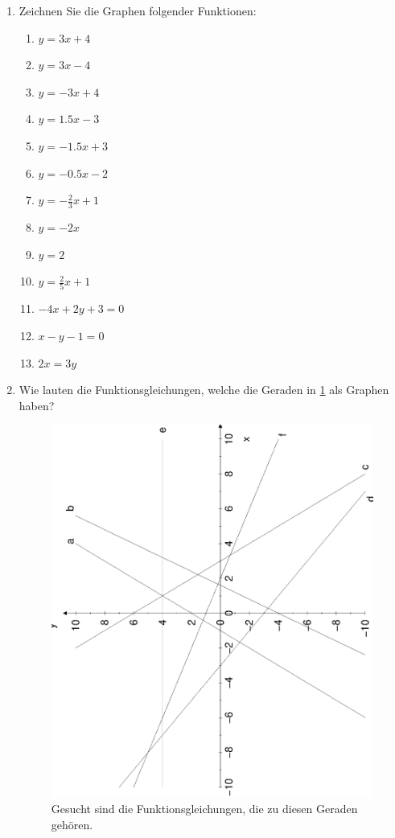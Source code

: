 \documentclass[%
11pt,%
twoside,%
titlepage,%
german,%
headsepline%
]{scrartcl}
\begin{document}
{{{\begin{enumerate}
\setcounter{uaufg}{0}
\item Zeichnen Sie die Graphen folgender Funktionen:
  \begin{enumerate}
  \item $\displaystyle y=3x+4$
  \item $\displaystyle y=3x-4$
  \item $\displaystyle y=-3x+4$
  \item $\displaystyle y=1.5x-3$
  \item $\displaystyle y=-1.5x+3$
  \item $\displaystyle y=-0.5x-2$
  \item $\displaystyle y=-\frac{2}{3}x+1$
  \item $\displaystyle y=-2x$
  \item $\displaystyle y=2$
  \item $\displaystyle y=\frac{2}{5}x+1$
  \item \label{aufg:linfkt2:zeichnen1} $\displaystyle -4x+2y+3=0$
  \item \label{aufg:linfkt2:zeichnen2} $\displaystyle x-y-1=0$
  \item \label{aufg:linfkt2:zeichnen3} $\displaystyle 2x=3y$
  \end{enumerate}


\item Wie lauten die Funktionsgleichungen, welche die Geraden in \ref{fig:linfkt2:ablesen} als Graphen haben?

\begin{figure}[b!]
  \centering
  \includegraphics[angle=-90,width=\linewidth]{pictures/ablesen.eps}
  \caption{Gesucht sind die Funktionsgleichungen, die zu diesen Geraden geh\"oren.}
  \label{fig:linfkt2:ablesen}
\end{figure}



\end{enumerate}}}}
\end{document}

